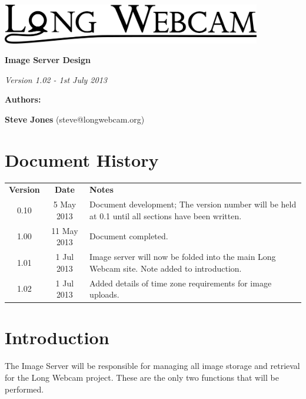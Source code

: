 \documentclass[11pt]{article}
\begin{document}
\begin{titlepage}
\begin{center}

\includegraphics[width=0.85\textwidth]{./Logo_Large-cropped_black.png}

\vspace{3 cm}

\textbf{\Huge{Image Server Design}}

\vspace{1 cm}

\textit{\large{Version 1.02 - 1st July 2013}}

\vspace{4 cm}

\textbf{\Large{Authors:}}

\textbf{Steve Jones} (steve@longwebcam.org)

\end{center}

\end{titlepage}

\setcounter{tocdepth}{2}
\tableofcontents
\clearpage
{}
\section*{Document History}
\begin{table}[tbhp!]
\begin{tabular}{ c c p{4in} }
\textbf{Version} & \textbf{Date} & \textbf{Notes} \\
0.10 & 5 May 2013 & Document development; The version number will be held at 0.1 until all sections have been written. \\
1.00 & 11 May 2013 & Document completed. \\
1.01 & 1 Jul 2013 & Image server will now be folded into the main Long Webcam site. Note added to introduction. \\
1.02 & 1 Jul 2013 & Added details of time zone requirements for image uploads.
\end{tabular}
\end{table}

\clearpage
{}


\section{Introduction}
The Image Server will be responsible for managing all image storage and retrieval for the Long Webcam project. These are the only two functions that will be performed.
\end{document}
